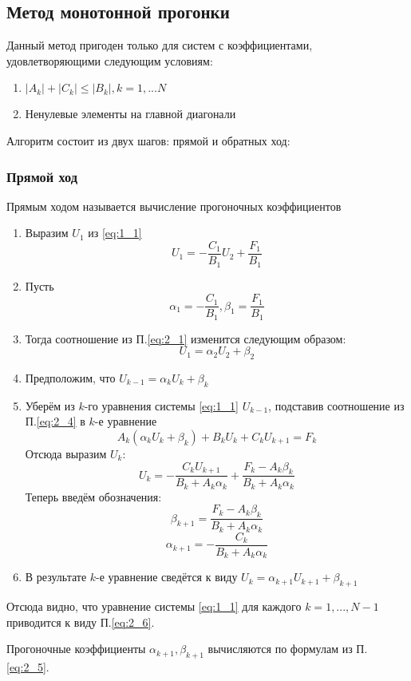 
\subsection{Метод монотонной прогонки}
Данный метод пригоден только для систем с коэффициентами, удовлетворяющими следующим условиям:
\begin{enumerate}
  \item \(|A_k| + |C_k| \leq |B_k|,k=1,...N\)
  \item Ненулевые элементы на главной диагонали
\end{enumerate}
Алгоритм состоит из двух шагов: прямой и обратных ход:

\subsubsection{Прямой ход}
Прямым ходом называется вычисление прогоночных коэффициентов
\begin{enumerate}
  \item Выразим \(U_1\) из \ref{eq:1_1} \label{eq:2_1}
        \[U_1=-\frac{C_1}{B_1}U_2+\frac{F_1}{B_1}\]
  \item Пусть \label{eq:2_2}
        \[\alpha_1=-\frac{C_1}{B_1}, \beta_1=\frac{F_1}{B_1}\]
  \item Тогда соотношение из П.\ref{eq:2_1} изменится следующим образом: \label{eq:2_3}
        \[U_1=\alpha_2U_2+\beta_2\]
  \item Предположим, что \(U_{k-1}=\alpha_k U_k + \beta_k\) \label{eq:2_4}
  \item Уберём из \(k\)-го уравнения системы \ref{eq:1_1} \(U_{k-1}\), подставив соотношение из П.\ref{eq:2_4} в \(k\)-е уравнение
        \[A_k(\alpha_k U_k + \beta_k) + B_k U_k + C_kU_{k+1}=F_k\]
        Отсюда выразим \(U_k\):
        \[U_k = - \frac{C_k U_{k+1}}{B_k+A_k\alpha_k} + \frac{F_k-A_k\beta_k}{B_k+A_k\alpha_k}\]
        Теперь введём обозначения: \label{eq:2_5}
        \[\beta_{k+1}=\frac{F_k-A_k\beta_k}{B_k+A_k\alpha_k}\]
        \[\alpha_{k+1}= - \frac{C_k}{B_k+A_k\alpha_k}\]
  \item В результате \(k\)-е уравнение сведётся к виду \(U_k=\alpha_{k+1} U_{k+1} + \beta_{k+1}\) \label{eq:2_6}
\end{enumerate}
Отсюда видно, что уравнение системы \ref{eq:1_1} для каждого \(k=1,...,N-1\) приводится к виду П.\ref{eq:2_6}.

Прогоночные коэффициенты \(\alpha_{k+1}, \beta_{k+1}\) вычисляются по формулам из П.\ref{eq:2_5}.

